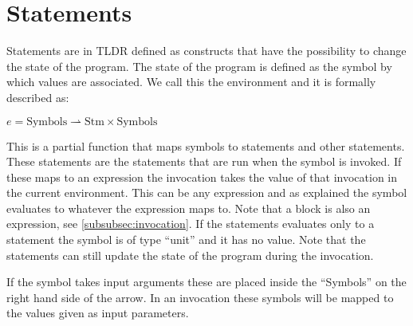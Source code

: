 \section{Statements}\label{sec:statements}
Statements are in TLDR defined as constructs that have the possibility to change the state of the program. The state of the program is defined as the symbol by which values are associated. We call this the environment and it is formally described as:
\begin{center}
$e = \text{Symbols} \rightharpoonup \text{Stm} \times \text{Symbols}$
\end{center}
This is a partial function that maps symbols to statements and other statements. These statements are the statements that are run when the symbol is invoked. If these maps to an expression the invocation takes the value of that invocation in the current environment. This can be any expression and as explained the symbol evaluates to whatever the expression maps to. Note that a block is also an expression, see \cref{subsubsec:invocation}. If the statements evaluates only to a statement the symbol is of type \enquote{unit} and it has no value. Note that the statements can still update the state of the program during the invocation. 

If the symbol takes input arguments these are placed inside the \enquote{Symbols} on the right hand side of the arrow. In an invocation these symbols will be mapped to the values given as input parameters.








